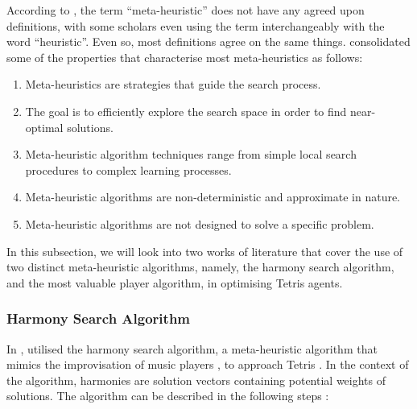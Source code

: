 \documentclass[a4paper, 12pt]{extreport}
\begin{document}
				
				According to \citeauthor{yang2020nature} \cite{yang2020nature}, the term ``meta-heuristic'' does not have any agreed upon definitions, with some scholars even using the term interchangeably with the word ``heuristic''. Even so, most definitions agree on the same things. \citeauthor{metaheuristic} \cite{metaheuristic} consolidated some of the properties that characterise most meta-heuristics as follows:
				
				\begin{enumerate}
					\item Meta-heuristics are strategies that guide the search process.
					\item The goal is to efficiently explore the search space in order to find near-optimal solutions.
					\item Meta-heuristic algorithm techniques range from simple local search procedures to complex learning processes.
					\item Meta-heuristic algorithms are non-deterministic and approximate in nature.
					\item Meta-heuristic algorithms are not designed to solve a specific problem.
				\end{enumerate}
				
				In this subsection, we will look into two works of literature that cover the use of two distinct meta-heuristic algorithms, namely, the harmony search algorithm, and the most valuable player algorithm, in optimising Tetris agents.
				
				\subsubsection{Harmony Search Algorithm}
					
					In \citeyear{tetris-harmony-search}, \citeauthor{tetris-harmony-search} utilised the harmony search algorithm, a meta-heuristic algorithm that mimics the improvisation of music players \cite{harmony-search}, to approach Tetris \cite{tetris-harmony-search}. In the context of the algorithm, harmonies are solution vectors containing potential weights of solutions. The algorithm can be described in the following steps \cite{tetris-harmony-search}:
					
\end{document}
